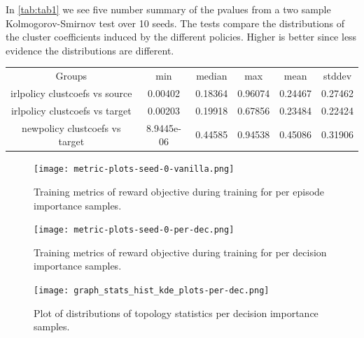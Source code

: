 \documentclass{report}
\numberwithin{equation}{section}
\numberwithin{figure}{section}
\numberwithin{table}{section}
\numberwithin{algorithm}{section}
\begin{document}
In \ref{tab:tab1} we see five number summary of the pvalues 
from a two sample Kolmogorov-Smirnov test over 10 seeds.
The tests compare the distributions of the cluster coefficients 
induced by the different policies. Higher is better since 
less evidence the distributions are different.
\begin{center}\label{tab:tab1}  
  \begin{tabular}{|c|c|c|c|c|c|}
    \hline
    Groups & min & median & max & mean & stddev\\
    irlpolicy clustcoefs vs source  & 0.00402 & 0.18364 & 0.96074 &  0.24467 & 0.27462\\
    irlpolicy clustcoefs vs target  & 0.00203 & 0.19918 & 0.67856 & 0.23484 & 0.22424\\
    newpolicy clustcoefs vs target & 8.9445e-06 & 0.44585 & 0.94538 & 0.45086 & 0.31906\\
    \hline
  \end{tabular}
  
\end{center}

\begin{figure}
  \texttt{[image: metric-plots-seed-0-vanilla.png]}
  \caption{Training metrics of reward objective during training for 
  per episode importance samples.}
\end{figure}

\begin{figure}
  \texttt{[image: metric-plots-seed-0-per-dec.png]}
  \caption{Training metrics of reward objective during training for 
  per decision importance samples.}
\end{figure}

\begin{figure}[H]
  \texttt{[image: graph\_stats\_hist\_kde\_plots-per-dec.png]}
  \caption{Plot of distributions of topology statistics 
  per decision importance samples.}
\end{figure}

\end{document}
